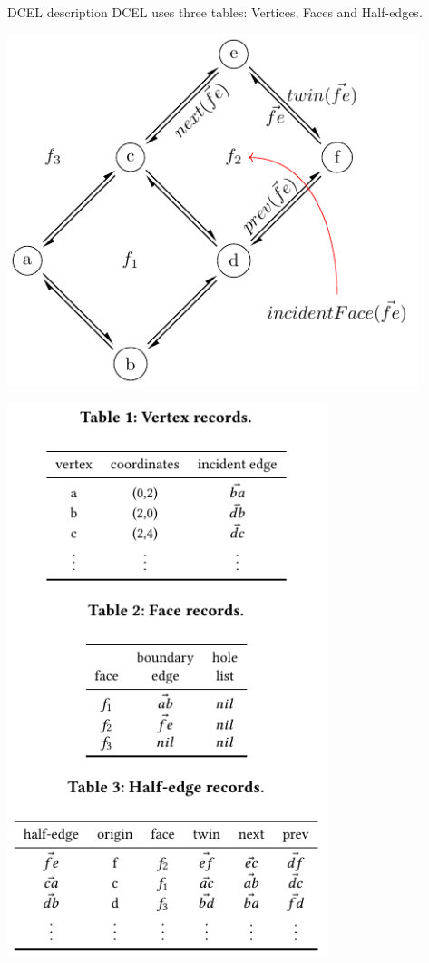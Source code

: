 \documentclass{beamer}
\begin{document}
    \begin{frame}{DCEL description}
    \small {DCEL uses three tables: Vertices, Faces and Half-edges.}
        \begin{minipage}{0.49\textwidth}
        
            \centering
            \includegraphics[width=0.9\textwidth]{figures/dcel_example}
        \end{minipage}\hfill %
        \begin{minipage}{0.49\textwidth}
            \centering
            \includegraphics[width=0.7\textwidth]{figures/dcel_records}
        \end{minipage}
    \end{frame}
\end{document}
